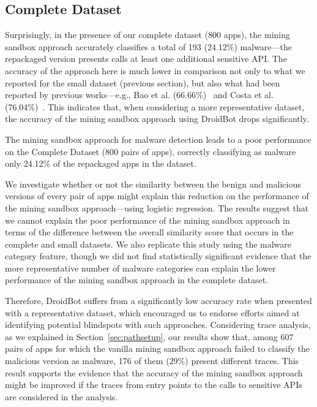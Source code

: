 \subsection{Complete Dataset} 

Surprisingly, in the presence of our complete dataset (\num{800} apps), the mining
sandbox approach accurately classifies a total of \num{193} (\num{24.12}\%) malware---the
repackaged version presents calls at least one additional sensitive API.
The accuracy of the approach here is much lower in comparison not only to what we reported for the
small dataset (previous section), but also what had been reported by previous works---e.g.,
Bao et al. (\num{66.66}\%)~\cite{DBLP:conf/wcre/BaoLL18} and Costa et al.
(\num{76.04}\%)~\cite{DBLP:journals/jss/CostaMMSSBNR22}. 
This indicates that, when considering a more representative dataset, the accuracy of the mining sandbox
approach using DroidBot drops significantly. 

\begin{obs}{4}{}
  The mining sandbox approach for malware detection
  leads to a poor performance on the Complete Dataset (\num{800} pairs of apps),
  correctly classifying as malware only \num{24.12}\% of the repackaged
  apps in the dataset.
\end{obs}

We investigate whether or not the similarity between
the benign and malicious versions of every pair of apps
might explain this reduction on the performance of
the mining sandbox approach---using logistic regression.
The results suggest that we cannot explain the
poor performance of the mining sandbox approach
in terms of the difference between the overall similarity score that occurs in the
complete and small datasets. We also replicate this study using the
malware category feature, though we did not find
statistically significant evidence that the more representative
number of malware categories can explain the lower
performance of the mining sandbox approach in the
complete dataset. 


Therefore, DroidBot suffers from a significantly low accuracy rate when presented with a representative dataset, 
which encouraged us to endorse efforts aimed at identifying potential blindspots with such approaches.
Considering trace analysis, as we explained in Section~\ref{sec:pathsetup},
our results show that, among $607$ pairs of apps for which the vanilla mining
sandbox approach failed to classify the malicious version as malware, \num{176} of them ($29$\%) present different traces.
This result supports the evidence that the accuracy of the mining sandbox approach might be improved if the traces
from entry points to the calls to sensitive APIs are considered in the analysis.

